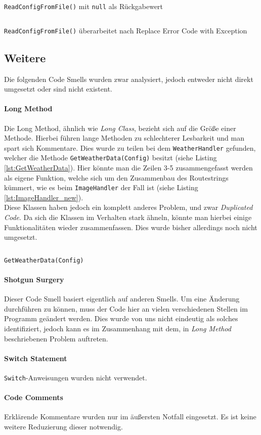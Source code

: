 \begin{listing}[h]
	\inputminted[linenos=true,frame=lines]{csharp}{Listings/ReadConfigFromFile_old.cs}
	\caption{\texttt{ReadConfigFromFile()} mit \texttt{null} als Rückgabewert}
	\label{lst:ReadConfigFromFile_old}
\end{listing}

\begin{listing}[h]
	\inputminted[linenos=true,frame=lines]{csharp}{Listings/ReadConfigFromFile_new.cs}
	\caption{\texttt{ReadConfigFromFile()} überarbeitet nach Replace Error Code with Exception}
	\label{lst:ReadConfigFromFile_new}
\end{listing}

\subsection{Weitere}
Die folgenden Code Smells wurden zwar analysiert, jedoch entweder nicht direkt umgesetzt oder sind nicht existent.
\paragraph{Long Method}
Die Long Method, ähnlich wie \textit{Long Class}, bezieht sich auf die Größe einer Methode.
Hierbei führen lange Methoden zu schlechterer Lesbarkeit und man spart sich Kommentare.
Dies wurde zu teilen bei dem \texttt{WeatherHandler} gefunden, welcher die Methode \texttt{GetWeatherData(Config)} besitzt (siehe Listing \ref{lst:GetWeatherData}).
Hier könnte man die Zeilen 3-5 zusammengefasst werden als eigene Funktion, welche sich um den Zusammenbau des Routestrings kümmert, wie es beim \texttt{ImageHandler} der Fall ist (siehe Listing \ref{lst:ImageHandler_new}).\\
Diese Klassen haben jedoch ein komplett anderes Problem, und zwar \textit{Duplicated Code}. 
Da sich die Klassen im Verhalten stark ähneln, könnte man hierbei einige Funktionalitäten wieder zusammenfassen. Dies wurde bisher allerdings noch nicht umgesetzt.

\begin{listing}[h]
	\inputminted[linenos=true,frame=lines]{csharp}{Listings/GetWeatherData.cs}
	\caption{\texttt{GetWeatherData(Config)}}
	\label{lst:GetWeatherData}
\end{listing}
\paragraph{Shotgun Surgery}
Dieser Code Smell basiert eigentlich auf anderen Smells. 
Um eine Änderung durchführen zu können, muss der Code hier an vielen verschiedenen Stellen im Programm geändert werden.
Dies wurde von uns nicht eindeutig als solches identifiziert, jedoch kann es im Zusammenhang mit dem, in \textit{Long Method} beschriebenen Problem auftreten.
\paragraph{Switch Statement}
\texttt{Switch}-Anweisungen wurden nicht verwendet.
\paragraph{Code Comments}
Erklärende Kommentare wurden nur im äußersten Notfall eingesetzt.
Es ist keine weitere Reduzierung dieser notwendig.